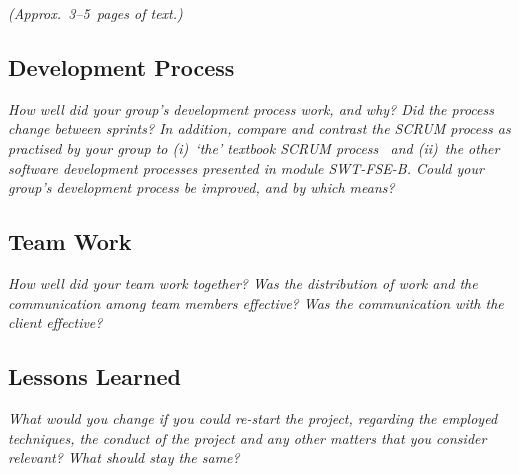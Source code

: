 \flushleft
\emph{(Approx.~3--5~pages of text.)}

\subsection{Development Process}
\emph{How well did your group's development process work, and why? Did the 
process change between sprints?  In addition, compare and contrast the SCRUM 
process as practised by your group to (i)~`the' textbook SCRUM 
process~\cite{scrumbook} and (ii)~the other software development processes 
presented in module SWT-FSE-B.  Could your group's development process 
be improved, and by which means?}

\subsection{Team Work}
\emph{How well did your team work together?  Was the distribution of work and the communication among team members effective? Was the communication with the client effective?}

\subsection{Lessons Learned}
\emph{What would you change if you could re-start the project, regarding the employed techniques, the conduct of the project and any other matters that you consider relevant?  What should stay the same?}
